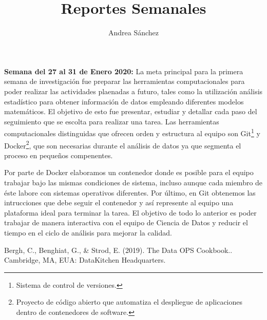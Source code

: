 \documentclass{article}
\title{Reportes Semanales}
\author{Andrea Sánchez}
\begin{document}
\maketitle
    \textbf{Semana del 27 al 31 de Enero 2020:}\newline 
    La meta principal para la primera semana de investigación fue preparar las herramientas computacionales para poder realizar las actividades plaenadas a futuro, tales como la utilización análisis estadístico para obtener información de datos empleando diferentes modelos matemáticos.
    El objetivo de esto fue presentar, estudiar y detallar cada paso del seguimiento que se escolta para realizar una tarea. Las herramientas computacionales distinguidas que ofrecen orden y estructura al equipo son Git\footnote{Sistema de control de versiones.} y Docker\footnote{Proyecto de código abierto que automatiza el despliegue de aplicaciones dentro de contenedores de software.}, que son necesarias durante el análisis de datos ya que segmenta el proceso en pequeños compenentes.

    Por parte de Docker elaboramos un contenedor donde es posible para el equipo trabajar bajo las mismas condiciones de sistema, incluso aunque cada miembro de éste labore con sistemas operativos diferentes. Por último, en Git obtenemos las intrucciones que debe seguir el contenedor y así represente al equipo una plataforma ideal para terminar la tarea. El objetivo de todo lo anterior es poder trabajar de manera interactiva con el equipo de Ciencia de Datos y reducir el tiempo en el ciclo de análisis para mejorar la calidad.


\begin{thebibliography}{1} 
 Bergh, C., Benghiat, G., \& Strod, E. (2019). The Data OPS Cookbook.. Cambridge, MA, EUA: DataKitchen Headquarters.
\end{thebibliography}
\end{document}
